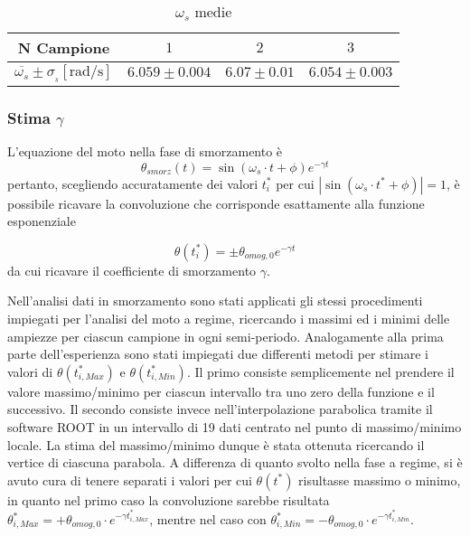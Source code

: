 \documentclass[a4paper,11pt,oneside]{article}
\begin{document}
\begin{table}[h!]
    \centering
    \begin{tabular}{|c|c|c|c|}
        \hline
        \textbf{N Campione} & $1$ & $2$ & $3$\\ \hline
        \rowcolor[rgb]{0.85,0.85,0.85}\textbf{$\overline{\omega_s}\pm \sigma_{\overline{_{s}}} [\si{\radian\per\second}]$} & $6.059\pm0.004$ & $6.07\pm0.01$ & $6.054\pm0.003$\\ \hline
    \end{tabular}
    \caption{$\omega_s$ medie}
    \label{tab:omega_s_medie}
\end{table}


\subsubsection{Stima $\gamma$}
L'equazione del moto nella fase di smorzamento è
\begin{equation*}
    \theta_{smorz}(t)=\sin{(\omega_{s}\cdot t + \phi )} e^{-\gamma t}
\end{equation*}
pertanto, scegliendo accuratamente dei valori $t^{\ast}_{i}$ per cui $| \sin{(\omega_{s} \cdot t^{\ast} + \phi)} |=1$, è possibile ricavare la convoluzione che corrisponde esattamente alla funzione esponenziale

\begin{equation*}
\theta(t_{i}^{\ast})=\pm \theta_{omog, 0} e^{-\gamma t}
\end{equation*}
da cui ricavare il coefficiente di smorzamento $\gamma$.\newline

Nell'analisi dati in smorzamento sono stati applicati gli stessi procedimenti impiegati per l'analisi del moto a regime, ricercando i massimi ed i minimi delle ampiezze per ciascun campione in ogni semi-periodo. Analogamente alla prima parte dell'esperienza sono stati impiegati due differenti metodi per stimare i valori di $\theta(t^{\ast}_{i, Max})$ e $\theta(t^{\ast}_{i, Min})$. Il primo consiste semplicemente nel prendere il valore massimo/minimo per ciascun intervallo tra uno zero della funzione e il successivo. Il secondo consiste invece nell'interpolazione parabolica tramite il software ROOT in un intervallo di 19 dati centrato nel punto di massimo/minimo locale. La stima del massimo/minimo dunque è stata ottenuta ricercando il vertice di ciascuna parabola. 
A differenza di quanto svolto nella fase a regime, si è avuto cura di tenere separati i valori per cui $\theta(t^{\ast})$ risultasse massimo o minimo, in quanto nel primo caso la convoluzione sarebbe risultata $\theta^{\ast}_{i, Max}=+\theta_{omog, 0}\cdot e^{- \gamma t^{\ast}_{i, Max}}$, mentre nel caso con $\theta^{\ast}_{i, Min}=-\theta_{omog, 0}\cdot e^{-\gamma t^{\ast}_{i, Min}}$.\\
\end{document}
